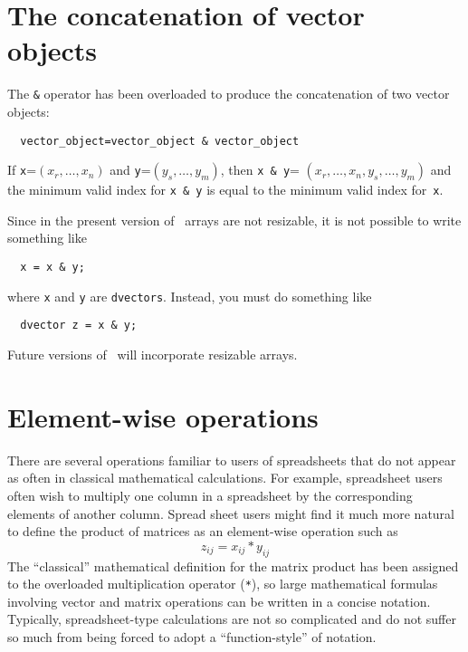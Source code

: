 \documentclass{admbmanual}
\begin{document}
\section{The concatenation of vector objects}

 
The \texttt{\&} operator has been overloaded to produce the
concatenation of two vector objects:
\begin{lstlisting}
  vector_object=vector_object & vector_object
\end{lstlisting}
If \texttt{x}=$(x_r,\ldots,x_n)$
and \texttt{y}=$(y_s,\ldots,y_m)$, then
\texttt{x \& y}= $(x_r,\ldots,x_n,y_s,\ldots,y_m)$ and the minimum valid
index for \texttt{x \& y} is equal to the minimum valid index for~\texttt{x}.

Since in the present version of \scAD\ arrays are not resizable,
it is not possible to write something like
\begin{lstlisting}
  x = x & y;
\end{lstlisting}
where \texttt{x} and \texttt{y} are \texttt{dvectors}. Instead, you
must do something like
\begin{lstlisting}
  dvector z = x & y;
\end{lstlisting}

Future versions of \scAD\ will incorporate resizable arrays.


\section{Element-wise operations}

There are several operations familiar to users of spreadsheets that do
not appear as often in classical mathematical 
calculations. For example, spreadsheet users often
wish to multiply one column in a spreadsheet by the corresponding
elements of another column. Spread sheet users might find it much more
natural to define the product of matrices as an element-wise operation
such as
\begin{equation*}
  z_{ij}= x_{ij}*y_{ij}
\end{equation*}
The ``classical'' mathematical definition for the
matrix product has been assigned to the overloaded multiplication operator (\texttt{*}),
so large mathematical formulas involving
vector and matrix operations can be written in a concise notation.
Typically, spreadsheet-type calculations are not so complicated
and do not suffer so much from being forced to adopt a
``function-style'' of notation.
\end{document}
